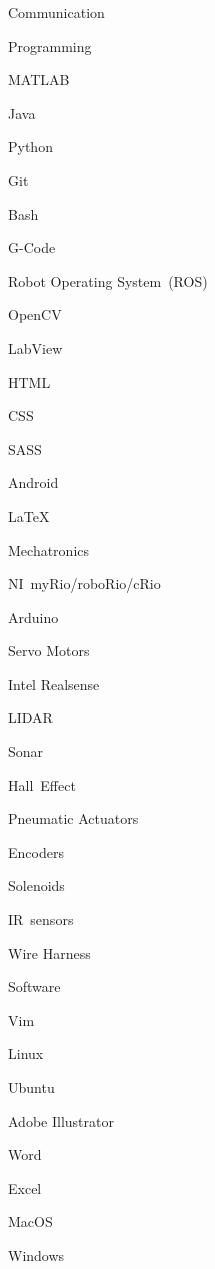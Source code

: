 \documentclass{resume}
\begin{document}
\begin{skills}{Communication}
\begin{commalist}
    \end{commalist}
  \item [Programming]
    \begin{commalist}
      \item MATLAB
      \item Java
      \item Python
      \item Git
      \item Bash
      \item G-Code
      \item Robot Operating System~(ROS)
      \item OpenCV
      \item LabView
      \item HTML
      \item CSS
      \item SASS
      \item Android
      \item \LaTeX
    \end{commalist}
  \item [Mechatronics]
    \begin{commalist}
      \item NI~myRio/roboRio/cRio
      \item Arduino
      \item Servo Motors
      \item Intel Realsense
      \item LIDAR
      \item Sonar
      \item Hall~Effect
      \item Pneumatic Actuators
      \item Encoders
      \item Solenoids
      \item IR~sensors
      \item Wire Harness
    \end{commalist}
  \item [Software]
    \begin{commalist}
      \item Vim
      \item Linux
      \item Ubuntu
      \item Adobe Illustrator
      \item Word
      \item Excel
      \item MacOS
      \item Windows

\end{commalist}
\end{skills}
\end{document}
